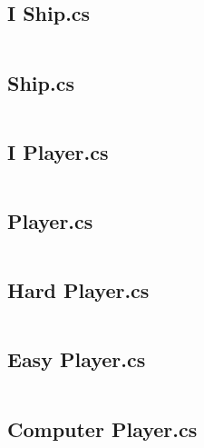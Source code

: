 	\newpage
	
	\subsection{I Ship.cs}
	\inputminted[linenos=true,fontsize=\footnotesize,tabsize=2]{csharp}{../Battleship/Battleship/I_Ship.cs}
	
	\newpage
	
	\subsection{Ship.cs}
	\inputminted[linenos=true,fontsize=\footnotesize,tabsize=2]{csharp}{../Battleship/Battleship/Ship.cs}
	
	\newpage
	
	\subsection{I Player.cs}
	\inputminted[linenos=true,fontsize=\footnotesize,tabsize=2]{csharp}{../Battleship/Battleship/I_Player.cs}
	
	\newpage
	
	\subsection{Player.cs}
	\inputminted[linenos=true,fontsize=\footnotesize,tabsize=2]{csharp}{../Battleship/Battleship/Player.cs}
	
	\newpage
	
	\subsection{Hard Player.cs}
	\inputminted[linenos=true,fontsize=\footnotesize,tabsize=2]{csharp}{../Battleship/Battleship/Hard_Player.cs}
	
	\newpage
	
	\subsection{Easy Player.cs}
	\inputminted[linenos=true,fontsize=\footnotesize,tabsize=2]{csharp}{../Battleship/Battleship/Easy_Player.cs}
	
	\newpage
	
	\subsection{Computer Player.cs}
	\inputminted[linenos=true,fontsize=\footnotesize,tabsize=2]{csharp}{../Battleship/Battleship/Computer.cs}
	
